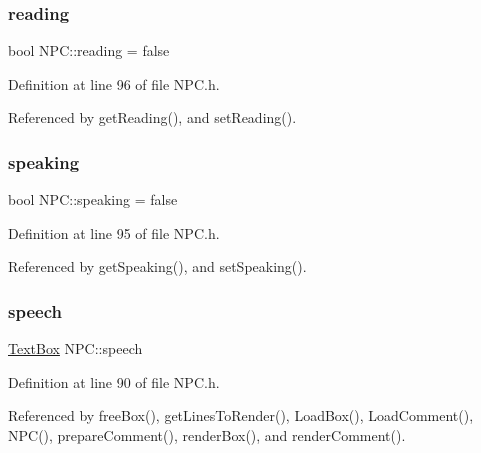 \subsubsection{\texorpdfstring{reading}{reading}}
{\footnotesize\ttfamily bool N\+P\+C\+::reading = false\hspace{0.3cm}{\ttfamily [private]}}



Definition at line 96 of file N\+P\+C.\+h.



Referenced by get\+Reading(), and set\+Reading().

\mbox{\label{class_n_p_c_a0dc17cd2d9b7d486e6d74089819117e7}} 
\subsubsection{\texorpdfstring{speaking}{speaking}}
{\footnotesize\ttfamily bool N\+P\+C\+::speaking = false\hspace{0.3cm}{\ttfamily [private]}}



Definition at line 95 of file N\+P\+C.\+h.



Referenced by get\+Speaking(), and set\+Speaking().

\mbox{\label{class_n_p_c_a1a1be15df827227f45559388897a9cd5}} 
\subsubsection{\texorpdfstring{speech}{speech}}
{\footnotesize\ttfamily \hyperlink{class_text_box}{Text\+Box} N\+P\+C\+::speech\hspace{0.3cm}{\ttfamily [private]}}



Definition at line 90 of file N\+P\+C.\+h.



Referenced by free\+Box(), get\+Lines\+To\+Render(), Load\+Box(), Load\+Comment(), N\+P\+C(), prepare\+Comment(), render\+Box(), and render\+Comment().

\mbox{\label{class_n_p_c_a64ad332dcfeb84a7a6bedd404378f05b}} 
